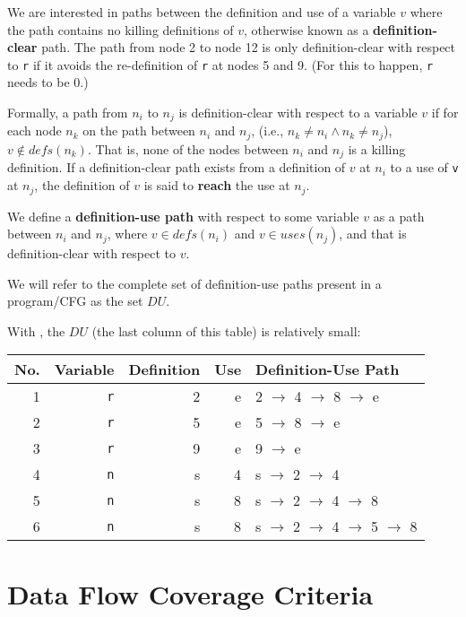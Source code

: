 We are interested in paths between the definition and use of a variable $v$
where the path contains no killing definitions of $v$, otherwise known as a {\bf
definition-clear} path. The path from node 2 to node 12 is only definition-clear
with respect to {\tt r} if it avoids the re-definition of {\tt r} at nodes 5 and
9. (For this to happen, {\tt r} needs to be 0.)

Formally, a path from $n_i$ to $n_j$ is definition-clear with respect to a
variable $v$ if for each node $n_k$ on the path between $n_i$ and $n_j$, (i.e.,
$n_k \neq n_i \wedge n_k \neq n_j$), $v \notin \mathit{defs}(n_k)$. That is,
none of the nodes between $n_i$ and $n_j$ is a killing definition. 
%
If a definition-clear path exists from a definition of $v$ at $n_i$ to a
use of {\tt v} at $n_j$, the definition of $v$ is said to {\bf reach} the use
at $n_j$.

We define a {\bf definition-use path} with respect to some variable $v$ as a
path between $n_i$ and $n_j$, where $v \in \mathit{defs}(n_i)$ and $v \in
\mathit{uses}(n_j)$, and that is definition-clear with respect to $v$.

We will refer to the complete set of definition-use paths present in a
program/CFG as the set $\mathit{DU}$. 

With \signmethod, the $DU$ (the last column of this table) is relatively small:

\begin{center}
\begin{tabular}{rrrrl}
    \toprule
    No. & Variable & Definition & Use & Definition-Use Path \\
    \midrule
    1 & {\tt r}  &          2 &   e & 2 $\rightarrow$ 4 $\rightarrow$ 8 $\rightarrow$ e \\
    2 & {\tt r}  &          5 &   e & 5 $\rightarrow$ 8 $\rightarrow$ e \\
    3 & {\tt r}  &          9 &   e & 9 $\rightarrow$ e \\
    4 & {\tt n}  &          s &   4 & s $\rightarrow$ 2 $\rightarrow$ 4 \\
    5 & {\tt n}  &          s &   8 & s $\rightarrow$ 2 $\rightarrow$ 4 $\rightarrow$ 8 \\
    6 & {\tt n}  &          s &   8 & s $\rightarrow$ 2 $\rightarrow$ 4 $\rightarrow$ 5 $\rightarrow$ 8 \\
    \bottomrule
\end{tabular}
\end{center}

\section{Data Flow Coverage Criteria}

